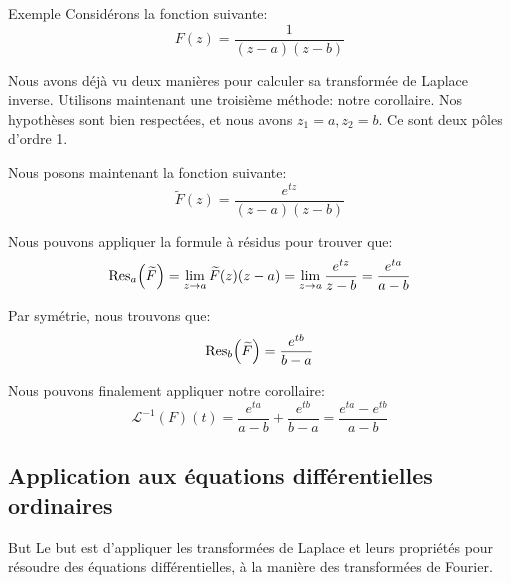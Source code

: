 \documentclass[a4paper]{article}
\begin{document}
\begin{parag}{Exemple}
    Considérons la fonction suivante: 
    \[F\left(z\right) = \frac{1}{\left(z-a\right)\left(z-b\right)}\]
    
    Nous avons déjà vu deux manières pour calculer sa transformée de Laplace inverse. Utilisons maintenant une troisième méthode: notre corollaire. Nos hypothèses sont bien respectées, et nous avons $z_1 = a, z_2 = b$. Ce sont deux pôles d'ordre 1.

    Nous posons maintenant la fonction suivante: 
    \[\widetilde{F}\left(z\right) = \frac{e^{tz}}{\left(z-a\right)\left(z-b\right)}\]
    
    Nous pouvons appliquer la formule à résidus pour trouver que: 
    \[\Res_a\left(\widetilde{F}\right) = \lim_{z \to a} \widetilde{F}\left(z\right)\left(z-a\right) = \lim_{z \to a} \frac{e^{tz}}{z-b} = \frac{e^{ta}}{a-b}\]
    
    Par symétrie, nous trouvons que:
    \[\Res_b\left(\widetilde{F}\right) = \frac{e^{tb}}{b-a}\]

    Nous pouvons finalement appliquer notre corollaire: 
    \[\mathcal{L}^{-1}\left(F\right)\left(t\right) = \frac{e^{ta}}{a-b} + \frac{e^{tb}}{b - a} = \frac{e^{ta} - e^{tb}}{a - b}\]
\end{parag}

\subsection[Application aux EDOs]{Application aux équations différentielles ordinaires}

\begin{parag}{But}
    Le but est d'appliquer les transformées de Laplace et leurs propriétés pour résoudre des équations différentielles, à la manière des transformées de Fourier. 
\end{parag}
\end{document}
